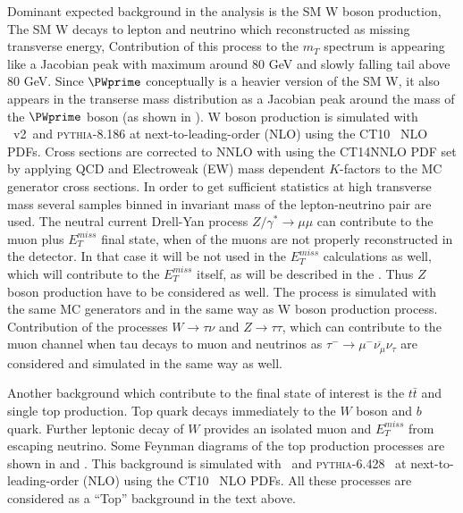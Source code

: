 Dominant expected background in the analysis is the SM W boson production,
The SM W decays to lepton and neutrino which reconstructed as missing transverse energy,
Contribution of this process to the $m_T$ spectrum is appearing like a Jacobian peak 
with maximum around 80 GeV and slowly falling tail above 80 GeV.
Since $\PWprime$ conceptually is a heavier version of the SM W, it also appears in the 
transerse mass distribution as a Jacobian peak around the mass of the $\PWprime$ boson
(as shown in ). 
W boson production is simulated with \powhegbox\ v2~\cite{Alioli:2010xd}and {\scshape pythia-8.186} at next-to-leading-order (NLO) using the CT10~\cite{CT10} NLO PDFs. 
Cross sections are corrected to NNLO with using the CT14NNLO PDF set by applying QCD and Electroweak (EW) mass dependent $K$-factors to the MC generator cross sections.
In order to get sufficient statistics at high transverse mass several samples binned in invariant mass of the lepton-neutrino pair are used.
The neutral current Drell-Yan process $Z/\gamma^* \to \mu \mu$ can contribute to the muon plus $E_T^{miss}$ final state, when of the muons are not properly reconstructed 
in the detector. In that case it will be not used in the $E_T^{miss}$ calculations as well, which will contribute to the $E_T^{miss}$ itself, as will be described in the .
Thus $Z$ boson production have to be considered as well. The process is simulated with the same MC generators and in the same way as W boson production process.
Contribution of the processes $W \to \tau \nu$ and $Z \to \tau \tau$, which can contribute to the muon channel 
when tau decays to muon and neutrinos as $\tau^{-} \to \mu^{-} \overline{\nu_{\mu}} \nu_{\tau} $ are considered and simulated in the same way as well.

Another background which contribute to the final state of interest is the $t\bar{t}$ and single top production.
Top quark decays immediately to the $W$ boson and $b$ quark. Further leptonic decay of $W$ provides an isolated muon and $E_T^{miss}$ from escaping neutrino.
Some Feynman diagrams of the top production processes are shown in  and .
This background is simulated with \powhegbox\ and {\scshape pythia-6.428}~\cite{Pythia} at next-to-leading-order (NLO) using the CT10~\cite{CT10} NLO PDFs.
All these processes are considered as a ``Top'' background in the text above.


